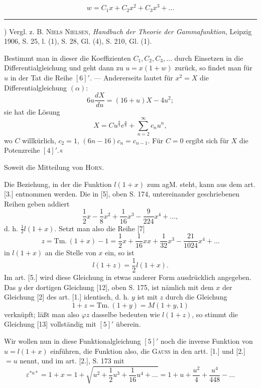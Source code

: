 \[w=C_1x+C_2x^2+C_3x^3+\ldots\]
\par\smallskip\noindent\rule{.25\linewidth}{.4pt}\par
{\small\par\indent *) Vergl. z. B. \textsc{Niels Nielsen}, \textit{Handbuch der Theorie der Gammafunktion}, Leipzig 1906, S. 25, l. (1), S. 28, Gl. (4), S. 210, Gl. (1).\par}
\clearpage
\fancyhead{}
\noindent Bestimmt man in dieser die Koeffizienten $C_1,C_2,C_3,\ldots$ durch Einsetzen in die Differentialgleichung und geht dann zu $u=x(1+w)$ zurück, so findet man für $u$ in der Tat die Reihe $[6]'$. — Andererseits lautet für $x^2=X$ die Differentialgleichung $(\alpha)$:
\[6u\frac{dX}{du}=(16+u)X-4u^2;\]
\noindent sie hat die Lösung
\[X=Cu^{\frac83}e^{\frac u6}+\sum_{n=2}^{\infty}c_nu^n,\]
\noindent wo $C$ willkürlich, $c_2=1$, $(6n-16)c_n=c_{n-1}$. Für $C=0$ ergibt sich für $X$ die  Potenzreihe $[4]'$.«
\par\indent Soweit die Mitteilung von \textsc{Horn}.
\par\indent Die Beziehung, in der die Funktion $l(1+x)$ zum agM. steht, kann aus dem art. [3.] entnommen werden. Die in [5], oben S. 174, untereinander geschriebenen Reihen geben addiert
\[\frac12x-\frac18x^2+\frac1{16}x^3-\frac9{224}x^4+\ldots,\]
\noindent d. h. $\frac12l(1+x)$. Setzt man also die Reihe [7]
\[z=\mathrm{Tm.}\,(1+x)-1=\frac12x+\frac1{16}xx+\frac1{32}x^3-\frac{21}{1024}x^4+\ldots\]
\noindent in $l(1+x)$ an die Stelle von $x$ ein, so ist
\begin{equation*}\tag*{$[5]'$}l(1+z)=\frac12l(1+x).\end{equation*}
\noindent Im art. [5.] wird diese Gleichung in etwas anderer Form ausdrücklich angegeben. Das $y$ der dortigen Gleichung [12], oben S. 175, ist nämlich mit dem $x$ der Gleichung [2] des art. [1.] identisch, d. h. $y$ ist mit $z$ durch die Gleichung
\[1+z=\mathrm{Tm.}\,(1+y)=M(1+y,1)\]
\noindent verknüpft; läßt man also $\varphi z$ dasselbe bedeuten wie $l(1+z)$, so stimmt die Gleichung [13] vollständig mit $[5]'$ überein.
\par\indent Wir wollen nun in diese Funktionalgleichung $[5]'$ noch die inverse Funktion von $u=l(1+x)$ einführen, die Funktion also, die \textsc{Gauss} in den artt. [1.] und [2.]  $=u$ nennt, und im art. [2.], S. 173 mit
\[\varepsilon^{*u*}=1+x=1+\sqrt{u^2+\frac12u^3+\frac1{16}u^4+\ldots}=1+u+\frac{u^2}{4}+\frac{u^4}{448}-\ldots\]
